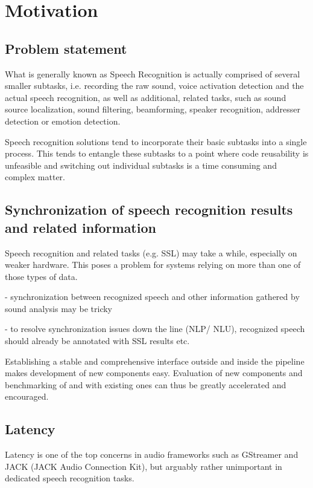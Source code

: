 
\chapter{Motivation}

\section{Problem statement} 
What is generally known as Speech Recognition is actually comprised of several smaller subtasks, i.e. recording the raw sound, voice activation detection and the actual speech recognition, as well as additional, related tasks, such as sound source localization, sound filtering, beamforming, speaker recognition, addresser detection or emotion detection. %

Speech recognition solutions tend to incorporate their basic subtasks into a single process.
This tends to entangle these subtasks to a point where code reusability is unfeasible and switching out individual subtasks is a time consuming and complex matter.

\section{Synchronization of speech recognition results and related information}

Speech recognition and related tasks (e.g. SSL) may take a while, especially on weaker hardware. 
This poses a problem for systems relying on more than one of those types of data. 

- synchronization between recognized speech and other information gathered by sound analysis may be tricky

- to resolve synchronization issues down the line (NLP/ NLU), recognized speech should already be annotated with SSL results etc.

Establishing a stable and comprehensive interface outside and inside the pipeline makes development of new components easy. 
Evaluation of new components and benchmarking of and with existing ones can thus be greatly accelerated and encouraged.%

\section{Latency}
Latency is one of the top concerns in audio frameworks such as GStreamer and JACK (JACK Audio Connection Kit), but arguably rather unimportant in dedicated speech recognition tasks. 
	

